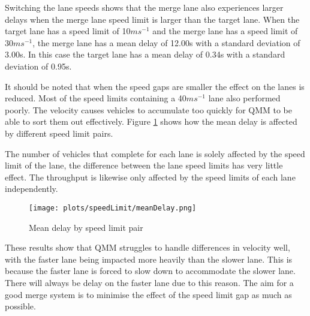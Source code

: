 Switching the lane speeds shows that the merge lane also experiences larger delays when the merge lane speed limit is larger than the target lane. When the target lane has a speed limit of 10$\si{ms^{-1}}$ and the merge lane has a speed limit of 30$\si{ms^{-1}}$, the merge lane has a mean delay of 12.00\si{s} with a standard deviation of 3.00\si{s}. In this case the target lane has a mean delay of 0.34\si{s} with a standard deviation of 0.95\si{s}.

It should be noted that when the speed gaps are smaller the effect on the lanes is reduced. Most of the speed limits containing a 40$\si{ms^{-1}}$ lane also performed poorly. The velocity causes vehicles to accumulate too quickly for QMM to be able to sort them out effectively. Figure \ref{fig:meanDelaySpeedLimit} shows how the mean delay is affected by different speed limit pairs.

The number of vehicles that complete for each lane is solely affected by the speed limit of the lane, the difference between the lane speed limits has very little effect. The throughput is likewise only affected by the speed limits of each lane independently.

\begin{figure}[p]
\centerline{
	\texttt{[image: plots/speedLimit/meanDelay.png]}
}
\caption{Mean delay by speed limit pair}
\label{fig:meanDelaySpeedLimit}
\end{figure}

These results show that QMM struggles to handle differences in velocity well, with the faster lane being impacted more heavily than the slower lane. This is because the faster lane is forced to slow down to accommodate the slower lane. There will always be delay on the faster lane due to this reason. The aim for a good merge system is to minimise the effect of the speed limit gap as much as possible.


